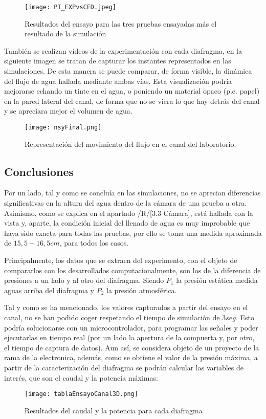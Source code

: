 \begin{figure}
\centering
\texttt{[image: PT\_EXPvsCFD.jpeg]}
\caption[Resultados del ensayo y simulación]{Resultados del ensayo para las tres pruebas ensayadas más el resultado de la simulación}
\label{fig:PT_EXPvsCFD}
\end{figure}

También se realizan vídeos de la experimentación con cada diafragma, en
la siguiente imagen se tratan de capturar los instantes representados en
las simulaciones. De esta manera se puede comparar, de forma visible, la
dinámica del flujo de agua hallada mediante ambas vías. Esta
visualización podría mejorarse echando un tinte en el agua, o poniendo
un material opaco (p.e. papel) en la pared lateral del canal, de forma
que no se viera lo que hay detrás del canal y se apreciara mejor el
volumen de agua.

\begin{figure}
\centering
\texttt{[image: nsyFinal.png]}
\caption{Representación del movimiento del flujo en el canal del laboratorio.}
\end{figure}

\subsection{Conclusiones}\label{header-n579}

Por un lado, tal y como se concluía en las simulaciones, no se aprecian
diferencias significativas en la altura del agua dentro de la cámara de
una prueba a otra. Asimismo, como se explica en el apartado /R/{[}3.3
Cámara{]}, está hallada con la vista y, aparte, la condición inicial del
llenado de agua es muy improbable que haya sido exacta para todas las
pruebas, por ello se toma una medida aproximada de \(15,5-16,5 cm\),
para todos los casos.

Principalmente, los datos que se extraen del experimento, con el objeto
de compararlos con los desarrollados computacionalmente, son los de la
diferencia de presiones a un lado y al otro del diafragma. Siendo
\(P_1\) la presión estática medida aguas arriba del diafragma y \(P_2\)
la presión atmosférica.

Tal y como se ha mencionado, los valores capturados a partir del ensayo
en el canal, no se han podido coger respetando el tiempo de simulación
de \(3seg\). Esto podría solucionarse con un microcontrolador, para
programar las señales y poder ejecutarlas en tiempo real (por un lado la
apertura de la compuerta y, por otro, el tiempo de captura de datos).
Aun así, se considera objeto de un proyecto de la rama de la
electronica, además, como se obtiene el valor de la presión máxima, a
partir de la caracterización del diafragma se podrán calcular las
variables de interés, que son el caudal y la potencia máximas:

\begin{figure}
\centering
\texttt{[image: tablaEnsayoCanal3D.png]}
\caption{Resultados del caudal y la potencia para cada diafragma}
\end{figure}


